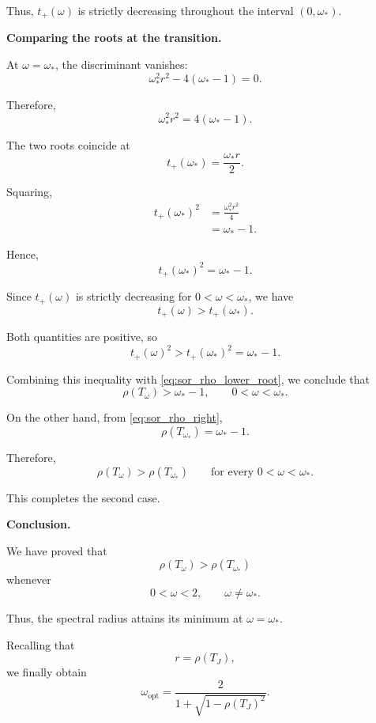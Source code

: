 \documentclass[11pt,a4paper]{article}
\theoremstyle{definition}
\theoremstyle{remark}
\begin{document}
Thus, $t_+(\omega)$ is strictly decreasing
throughout the interval $(0,\omega_*)$.

\medskip
\noindent
\textbf{Comparing the roots at the transition.}

At $\omega=\omega_*$, the discriminant
vanishes:
\[
    \omega_*^2r^2-4(\omega_*-1)=0.
\]

Therefore,
\[
    \omega_*^2r^2=4(\omega_*-1).
\]

The two roots coincide at
\[
    t_+(\omega_*)=\frac{\omega_*r}{2}.
\]

Squaring,
\[
\begin{aligned}
    t_+(\omega_*)^2
    &=
    \frac{\omega_*^2r^2}{4}\\
    &=\omega_*-1.
\end{aligned}
\]

Hence,
\begin{equation}
    \boxed{
    t_+(\omega_*)^2=\omega_*-1.
    }
    \label{eq:sor_root_transition}
\end{equation}

Since $t_+(\omega)$ is strictly
decreasing for $0<\omega<\omega_*$,
we have
\[
    t_+(\omega)>t_+(\omega_*).
\]

Both quantities are positive, so
\[
    t_+(\omega)^2>
    t_+(\omega_*)^2
    =
    \omega_*-1.
\]

Combining this inequality with
\eqref{eq:sor_rho_lower_root},
we conclude that
\begin{equation}
    \boxed{
    \rho(T_\omega)>
    \omega_*-1,
    \qquad 0<\omega<\omega_*.
    }
    \label{eq:sor_rho_left}
\end{equation}

On the other hand, from
\eqref{eq:sor_rho_right},
\[
    \rho(T_{\omega_*})=\omega_*-1.
\]

Therefore,
\[
    \rho(T_\omega)>
    \rho(T_{\omega_*})
    \qquad
    \text{for every }0<\omega<\omega_*.
\]

This completes the second case.

\medskip
\noindent
\textbf{Conclusion.}

We have proved that
\[
    \rho(T_\omega)>
    \rho(T_{\omega_*})
\]
whenever
\[
    0<\omega<2,
    \qquad \omega\neq\omega_*.
\]

Thus, the spectral radius attains its
minimum at $\omega=\omega_*$.

Recalling that
\[
    r=\rho(T_J),
\]
we finally obtain
\begin{equation}
    \boxed{
    \omega_{\mathrm{opt}}
    =
    \frac{2}{
        1+\sqrt{1-\rho(T_J)^2}
    }.
    }
    \label{eq:sor_optimal_omega}
\end{equation}
\end{document}
